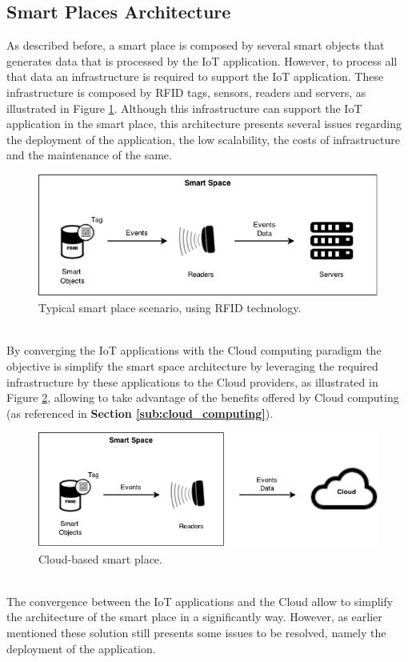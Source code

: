 \subsection{Smart Places Architecture}
\label{sub:smart_places_architecture}
As described before, a smart place is composed by several smart objects that generates
data that is processed by the IoT application. However, to process all that data an
infrastructure is required to support the IoT application. These infrastructure is composed
by RFID tags, sensors, readers and servers, as illustrated in Figure \ref{fig:smart-place}.
Although this infrastructure can support the IoT application in the smart place, this
architecture presents several issues regarding the deployment of the application, the low scalability,
the costs of infrastructure and the maintenance of the same.
\pagebreak
\begin{figure}[h!]
  \centering
  \includegraphics[width=\textwidth]{./images/smart-space}
  \caption{Typical smart place scenario, using RFID technology.}
  \label{fig:smart-place}
\end{figure}\\
By converging the IoT applications with the Cloud computing paradigm the objective is simplify the
smart space architecture by leveraging the required infrastructure by these applications to
the Cloud providers, as illustrated in Figure \ref{fig:smart-place-cloud}, allowing to take
advantage of the benefits offered by Cloud computing (as referenced in \textbf{Section \ref{sub:cloud_computing}}).
\begin{figure}
  \centering
  \includegraphics[width=\textwidth]{./images/smart-space-cloud}
  \caption{Cloud-based smart place.}
  \label{fig:smart-place-cloud}
\end{figure}\\
The convergence between the IoT applications and the Cloud allow to simplify the
architecture of the smart place in a significantly way. However, as earlier mentioned
these solution still presents some issues to be resolved, namely the deployment of
the application.
